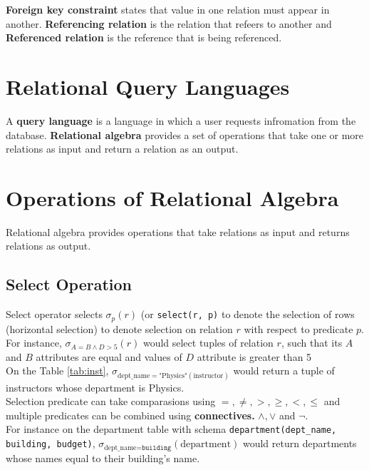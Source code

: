 \documentclass[11pt,a4paper,twocolumn]{book}
\begin{document}
\textbf{Foreign key constraint} states that value in one relation must appear in another. \textbf{Referencing relation} is the relation that refeers to another and \textbf{Referenced relation} is the reference that is being referenced.

\section{Relational Query Languages}

A \textbf{query language} is a language in which a user requests infromation from the database. \textbf{Relational algebra} provides a set of operations that take one or more relations as input and return a relation as an output.

\section{Operations of Relational Algebra}

Relational algebra provides operations that take relations as input and returns relations as output.

\subsection{Select Operation}

Select operator selects $\sigma_p (r)$ (or \texttt{select(r, p)} to denote the selection of rows (horizontal selection) to denote selection on relation $r$ with respect to predicate $p$.\\

For instance, $\sigma_{A=B \land D>5}(r)$ would select tuples of relation $r$, such that its $A$ and $B$ attributes are equal and values of $D$ attribute is greater than 5\\

On the Table \ref{tab:inst}, $\sigma_{\text{dept\_name}=\text{"Physics"}(\text{instructor})}$ would return a tuple of instructors whose department is Physics.\\

Selection predicate can take comparasions using $=, \neq, >, \geq, <, \leq$ and multiple predicates can be combined using \textbf{connectives.} $\land, \lor$ and $\lnot$.\\

For instance on the department table with schema \texttt{department(dept\_name, building, budget)}, $\sigma_{\text{dept\_name}=\texttt{building}}(\text{department})$ would return departments whose names equal to their building's name.\\
\end{document}
